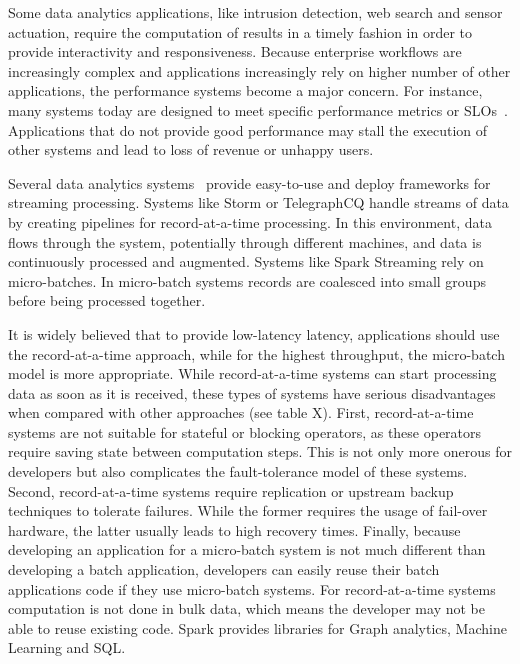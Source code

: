 Some data analytics applications, like intrusion detection, web search and sensor actuation, require the computation of results in a timely fashion in order to provide interactivity and responsiveness. 
Because enterprise workflows are increasingly complex and applications increasingly rely on higher number of other applications, the performance systems become a major concern.
For instance, many systems today are designed to meet specific performance metrics or SLOs~\cite{Jockey}.
Applications that do not provide good performance may stall the execution of other systems and lead to loss of revenue or unhappy users.

Several data analytics 
systems~\cite{Babu:2001:CQO:603867.603884,TelegraphCQ,Storm,SparkStreaming,Trill,Naiad,Niagara,StreamInsight,Carney:2002:MSN:1287369.1287389,Sullivan:1998:TSM:1268256.1268258,Condie:2010:MO:1855711.185573,Brito:2011:SLD:2114498.2116192} 
provide easy-to-use and deploy frameworks for streaming processing.
Systems like Storm or TelegraphCQ handle streams of data by creating pipelines for record-at-a-time processing. In this environment, data flows through the system, potentially through different machines, and data is continuously processed and augmented.
Systems like Spark Streaming rely on micro-batches. In micro-batch systems records are coalesced into small groups before being processed together.

It is widely believed that to provide low-latency latency, applications should use the record-at-a-time approach, while for the highest throughput, the micro-batch model is more appropriate. 
While record-at-a-time systems can start processing data as soon as it is received, these types of systems have serious disadvantages when compared with other approaches (see table X).
First, record-at-a-time systems are not suitable for stateful or blocking operators, as these operators require saving state between computation steps. This is not only more onerous for developers but also complicates the fault-tolerance model of these systems.
Second, record-at-a-time systems require replication or upstream backup techniques to tolerate failures.
While the former requires the usage of fail-over hardware, the latter usually leads to high recovery times.
Finally, because developing an application for a micro-batch system is not much different than developing a batch application, developers can easily reuse their batch applications code if they use micro-batch systems. For record-at-a-time systems computation is not done in bulk data, which means the developer may not be able to reuse existing code.
Spark provides libraries for Graph analytics, Machine Learning and SQL.

